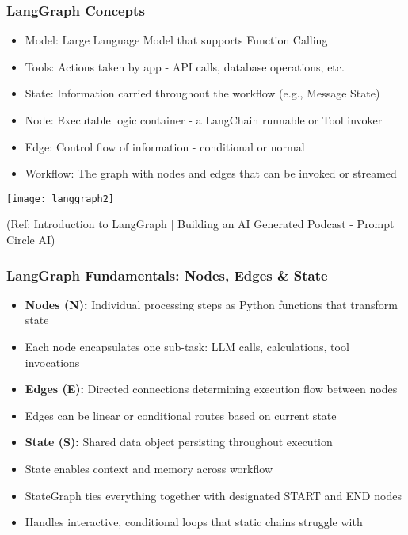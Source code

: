 \begin{frame}\frametitle{LangGraph Concepts}
\begin{itemize}
\item Model: Large Language Model that supports Function Calling
\item Tools: Actions taken by app - API calls, database operations, etc.
\item State: Information carried throughout the workflow (e.g., Message State)
\item Node: Executable logic container - a LangChain runnable or Tool invoker
\item Edge: Control flow of information - conditional or normal
\item Workflow: The graph with nodes and edges that can be invoked or streamed
\end{itemize}

\begin{center}
\texttt{[image: langgraph2]}
\end{center}	  
{\tiny (Ref: Introduction to LangGraph | Building an AI Generated Podcast - Prompt Circle AI)}
\end{frame}


\begin{frame}[fragile]\frametitle{LangGraph Fundamentals: Nodes, Edges \& State}
      \begin{itemize}
        \item \textbf{Nodes (N):} Individual processing steps as Python functions that transform state
        \item Each node encapsulates one sub-task: LLM calls, calculations, tool invocations
        \item \textbf{Edges (E):} Directed connections determining execution flow between nodes
        \item Edges can be linear or conditional routes based on current state
        \item \textbf{State (S):} Shared data object persisting throughout execution
        \item State enables context and memory across workflow
        \item StateGraph ties everything together with designated START and END nodes
        \item Handles interactive, conditional loops that static chains struggle with
      \end{itemize}
\end{frame}



